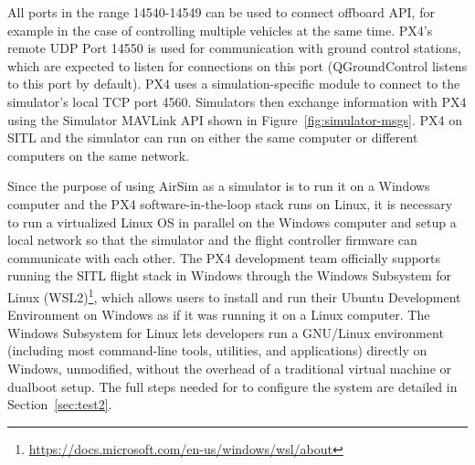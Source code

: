 All ports in the range 14540-14549 can be used to connect offboard API, for example in the case of controlling multiple vehicles at the same time.
PX4's remote UDP Port 14550 is used for communication with ground control stations, which are expected to listen for connections on this port (QGroundControl listens to this port by default).
PX4 uses a simulation-specific module to connect to the simulator's local TCP port 4560. 
Simulators then exchange information with PX4 using the Simulator MAVLink API shown in Figure~\ref{fig:simulator-msgs}. 
PX4 on SITL and the simulator can run on either the same computer or different computers on the same network.

Since the purpose of using AirSim as a simulator is to run it on a Windows computer and the PX4 software-in-the-loop stack runs on Linux, it is necessary to run a virtualized Linux OS in parallel on the Windows computer and setup a local network so that the simulator and the flight controller firmware can communicate with each other.
The PX4 development team officially supports running the SITL flight stack in Windows through the Windows Subsystem for Linux (WSL2)\footnote{\url{https://docs.microsoft.com/en-us/windows/wsl/about}}, which allows users to install and run their Ubuntu Development Environment on Windows as if it was running it on a Linux computer.
The Windows Subsystem for Linux lets developers run a GNU/Linux environment (including most command-line tools, utilities, and applications) directly on Windows, unmodified, without the overhead of a traditional virtual machine or dualboot setup.
The full steps needed for to configure the system are detailed in Section~\ref{sec:test2}.

